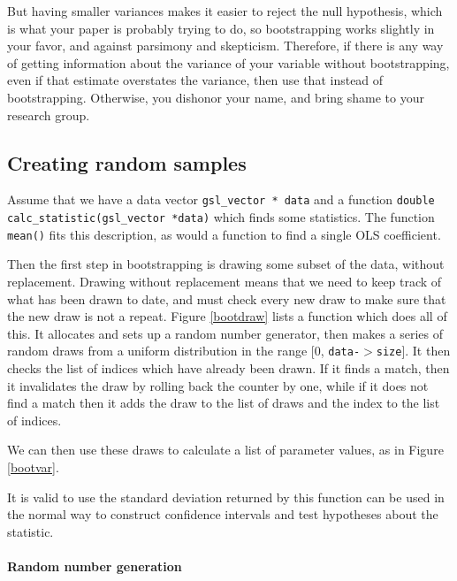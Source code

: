 But having smaller variances makes
it easier to reject the null hypothesis, which is what your paper is
probably trying to do, so bootstrapping works slightly in your favor,
and against parsimony and skepticism. Therefore, if there is any way
of getting information about the variance of your variable without
bootstrapping, even if that estimate overstates the variance, then use
that instead of bootstrapping. Otherwise, you dishonor your name, and
bring shame to your research group.


\subsection{Creating random samples} Assume that we have a
data vector {\tt gsl\_vector * data} and a function {\tt double
calc\_\-stat\-istic(gsl\_\-vec\-tor *data)} which finds some statistics. The
function {\tt mean()} fits this description, as would a function to find
a single OLS coefficient.

Then the first step in bootstrapping is drawing some subset of the data,
without replacement. Drawing without replacement means that we need to
keep track of what has been drawn to date, and must check every new draw
to make sure that the new draw is not a repeat. Figure \ref{bootdraw} lists a function which
does all of this. It allocates and sets up a random number generator, then
makes a series of random draws from a uniform distribution in the range
[0, {\tt data-$>$size}]. It then checks the list of indices which have
already been drawn. If it finds a match, then it invalidates the draw
by rolling back the counter by one, while if it does not find a match then it
adds the draw to the list of draws and the index to the list of indices.


We can then use these draws to calculate a list of parameter values, as in Figure \ref{bootvar}.

It is valid to use the standard deviation returned by this function can
be used in the normal way to construct confidence intervals and test
hypotheses about the statistic.

\paragraph{Random number generation}\label{randomnumbers}

